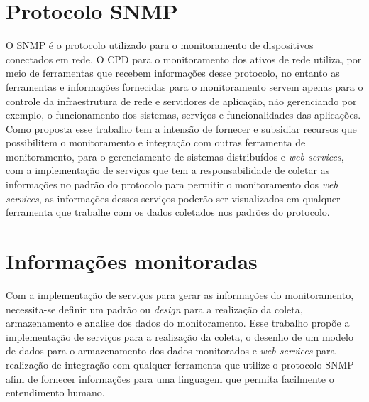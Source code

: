 \section{Protocolo SNMP}
\label{integracao_snmp}
O SNMP é o protocolo utilizado para o monitoramento de dispositivos conectados em rede. O CPD para o monitoramento dos ativos de rede utiliza, por meio de ferramentas que recebem informações desse protocolo, no entanto as ferramentas e informações fornecidas para o monitoramento servem apenas para o controle da infraestrutura de rede e servidores de aplicação, não gerenciando por exemplo, o funcionamento dos sistemas, serviços e funcionalidades das aplicações. Como proposta esse trabalho tem a intensão de fornecer e subsidiar  recursos que possibilitem o monitoramento e integração com outras ferramenta de monitoramento, para o gerenciamento de sistemas distribuídos e \textit{web services}, com a implementação de serviços que tem a responsabilidade de coletar as informações no padrão do protocolo para permitir o monitoramento dos \textit{web services}, as informações desses serviços poderão ser visualizados em qualquer ferramenta que trabalhe com os dados coletados nos padrões do protocolo.           


\section{Informações monitoradas}

Com a implementação de serviços para gerar as informações do monitoramento, necessita-se definir um padrão ou \textit{design} para a realização da coleta, armazenamento e analise dos dados do monitoramento. Esse trabalho propõe a implementação de serviços para a realização da coleta, o desenho de um modelo de dados para o armazenamento dos dados monitorados e \textit{web services} para realização de integração com qualquer ferramenta que utilize o protocolo SNMP afim de fornecer informações para uma linguagem que permita facilmente o entendimento humano. 

